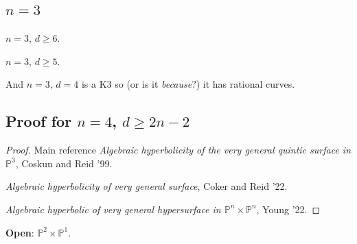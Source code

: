 \subsection{$n=3$}

\begin{thm}[Xu, '94]\leavevmode
$n=3$, $d \geq  6$.
\end{thm}

\begin{thm}\leavevmode
$n=3$, $d \geq 5$.
\end{thm}

And $n=3$, $d=4$ is a  K3 so (or is it \textit{because}?)  it has rational curves.

\subsection{Proof for $n=4$, $d\geq 2n-2$}


\begin{proof}\leavevmode
	Main reference  \textit{Algebraic hyperbolicity of the very general quintic surface in $\mathbb{P}^3$}, Coskun and Reid '99.

	\textit{Algebraic hyperbolicity of very general surface}, Coker and Reid '22.

	\textit{Algebraic hyperbolic of very general hypersurface in $\mathbb{P}^n\times\mathbb{P}^n$}, Young '22. 
\end{proof}

\textbf{Open}: $\mathbb{P}^2 \times \mathbb{P}^1$.

